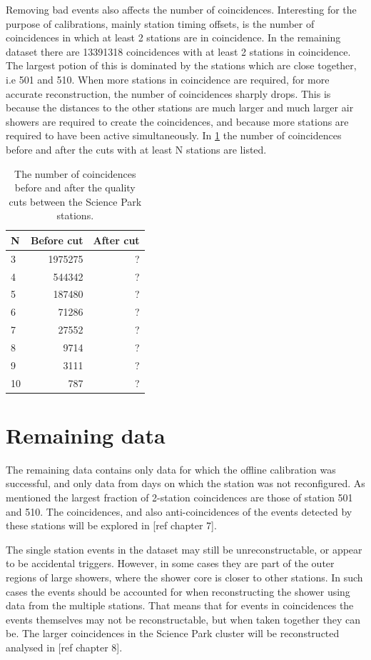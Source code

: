 Removing bad events also affects the number of coincidences. Interesting for the purpose of calibrations, mainly station timing offsets, is the number of coincidences in which at least 2 stations are in coincidence. In the remaining dataset there are \num{13391318} coincidences with at least 2 stations in coincidence. The largest potion of this is dominated by the stations which are close together, i.e 501 and 510. When more stations in coincidence are required, for more accurate reconstruction, the number of coincidences sharply drops. This is because the distances to the other stations are much larger and much larger air showers are required to create the coincidences, and because more stations are required to have been active simultaneously. In \cref{tab:remaining_coincidences} the number of coincidences before and after the cuts with at least N stations are listed.

\begin{table}
    \centering
    \begin{tabular}{@{}lrr@{}}
        \toprule
        N  & Before cut & After cut \\
        \midrule
         3 &    1975275 &         ? \\
         4 &     544342 &         ? \\
         5 &     187480 &         ? \\
         6 &      71286 &         ? \\
         7 &      27552 &         ? \\
         8 &       9714 &         ? \\
         9 &       3111 &         ? \\
        10 &        787 &         ? \\
        \bottomrule
    \end{tabular}
    \caption{The number of coincidences before and after the quality cuts between the Science Park stations.}
    \label{tab:remaining_coincidences}
\end{table}


\section{Remaining data}

The remaining data contains only data for which the offline calibration was successful, and only data from days on which the station was not reconfigured. As mentioned the largest fraction of 2-station coincidences are those of station 501 and 510. The coincidences, and also anti-coincidences of the events detected by these stations will be explored in [ref chapter 7].

The single station events in the dataset may still be unreconstructable, or appear to be accidental triggers. However, in some cases they are part of the outer regions of large showers, where the shower core is closer to other stations. In such cases the events should be accounted for when reconstructing the shower using data from the multiple stations. That means that for events in coincidences the events themselves may not be reconstructable, but when taken together they can be. The larger coincidences in the Science Park cluster will be reconstructed analysed in [ref chapter 8].
